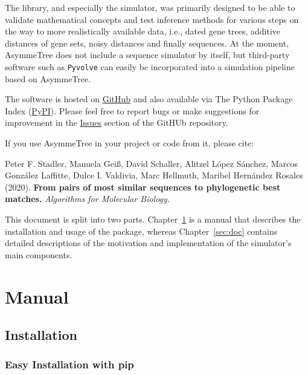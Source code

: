 \documentclass[hidelinks,11pt]{scrreprt}
\begin{document}
The library, and especially the simulator, was primarily designed to be able to validate mathematical concepts and test inference methods for various steps on the way to more realistically available data, i.e., dated gene trees, additive distances of gene sets, noisy distances and finally sequences.
At the moment, AsymmeTree does not include a sequence simulator by itself, but third-party software such as \texttt{Pyvolve} \cite{spielman2015} can easily be incorporated into a simulation pipeline based on AsymmeTree.

The software is hosted on \href{https://github.com/david-schaller/AsymmeTree}{GitHub} and also available via The Python Package Index (\href{https://pypi.org/project/asymmetree/}{PyPI}).
Please feel free to report bugs or make suggestions for improvement in the \href{https://github.com/david-schaller/AsymmeTree/issues}{Issues} section of the GitHUb repository.

If you use AsymmeTree in your project or code from it, please cite:

\vspace{3mm}
\begin{adjustwidth}{1cm}{1cm}
	Peter F. Stadler, Manuela Gei{\ss}, David Schaller, Alitzel L{\'o}pez S{\'a}nchez, Marcos Gonz{\'a}lez Laffitte, Dulce I. Valdivia, Marc Hellmuth, Maribel Hern{\'a}ndez Rosales (2020). \textbf{From pairs of most similar sequences to phylogenetic best matches.} \textit{Algorithms for Molecular Biology.}
\end{adjustwidth}
\vspace{3mm}

This document is split into two parts. Chapter~\ref{sec:manual} is a manual that describes the installation and usage of the package, whereas Chapter~\ref{sec:doc} contains detailed descriptions of the motivation and implementation of the simulator's main components.

\chapter{Manual}\label{sec:manual}

\section{Installation}

\subsection{Easy Installation with pip}
\end{document}
